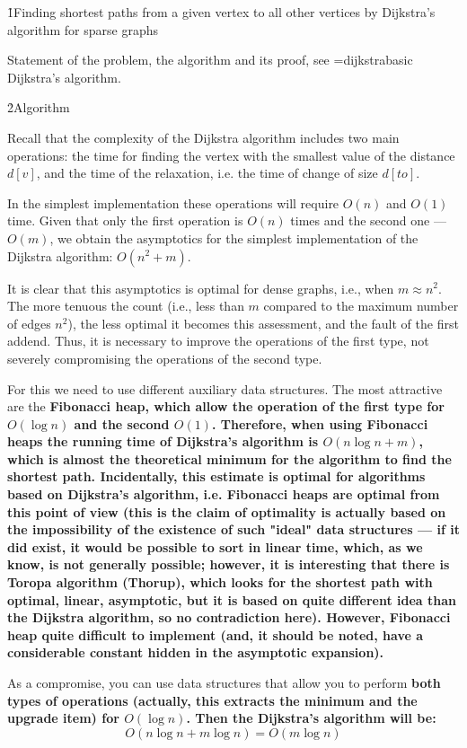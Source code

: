 \h1{Finding shortest paths from a given vertex to all other vertices by Dijkstra's algorithm for sparse graphs}

Statement of the problem, the algorithm and its proof, see \algohref=dijkstra{basic Dijkstra's algorithm}.

\h2{Algorithm}

Recall that the complexity of the Dijkstra algorithm includes two main operations: the time for finding the vertex with the smallest value of the distance $d[v]$, and the time of the relaxation, i.e. the time of change of size $d[to]$.

In the simplest implementation these operations will require $O(n)$ and $O(1)$ time. Given that only the first operation is $O(n)$ times and the second one --- $O(m)$, we obtain the asymptotics for the simplest implementation of the Dijkstra algorithm: $O(n^2+m)$.

It is clear that this asymptotics is optimal for dense graphs, i.e., when $m \approx n^2$. The more tenuous the count (i.e., less than $m$ compared to the maximum number of edges $n^2$), the less optimal it becomes this assessment, and the fault of the first addend. Thus, it is necessary to improve the operations of the first type, not severely compromising the operations of the second type.

For this we need to use different auxiliary data structures. The most attractive are the \bf{Fibonacci heap}, which allow the operation of the first type for $O(\log n)$ and the second $O(1)$. Therefore, when using Fibonacci heaps the running time of Dijkstra's algorithm is $O(n \log n + m)$, which is almost the theoretical minimum for the algorithm to find the shortest path. Incidentally, this estimate is optimal for algorithms based on Dijkstra's algorithm, i.e. Fibonacci heaps are optimal from this point of view (this is the claim of optimality is actually based on the impossibility of the existence of such "ideal" data structures --- if it did exist, it would be possible to sort in linear time, which, as we know, is not generally possible; however, it is interesting that there is Toropa algorithm (Thorup), which looks for the shortest path with optimal, linear, asymptotic, but it is based on quite different idea than the Dijkstra algorithm, so no contradiction here). However, Fibonacci heap quite difficult to implement (and, it should be noted, have a considerable constant hidden in the asymptotic expansion).

As a compromise, you can use data structures that allow you to perform \bf{both types of operations} (actually, this extracts the minimum and the upgrade item) for $O(\log n)$. Then the Dijkstra's algorithm will be:
$$ O(n \log n + m \log n) = O (m \log n) $$

